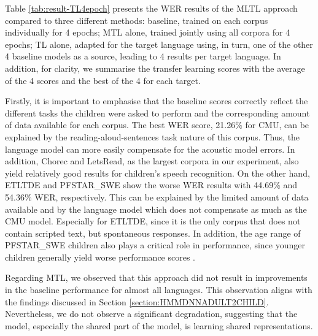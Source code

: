 Table \ref{tab:result-TL4epoch} presents the \ac{WER} results of the \ac{MLTL} approach compared to three different methods: baseline, trained on each corpus individually for 4 epochs; \ac{MTL} alone, trained jointly using all corpora for 4 epochs; \ac{TL} alone, adapted for the target language using, in turn, one of the other 4 baseline models as a source, leading to 4 results per target language. In addition, for clarity, we summarise the transfer learning scores with the average of the 4 scores and the best of the 4 for each target.

Firstly, it is important to emphasise that the baseline scores correctly reflect the different tasks the children were asked to perform and the corresponding amount of data available for each corpus. The best \ac{WER} score, 21.26\% for CMU, can be explained by the reading-aloud-sentences task nature of this corpus. Thus, the language model can more easily compensate for the acoustic model errors. In addition, Chorec and LetsRead, as the largest corpora in our experiment, also yield relatively good results for children's speech recognition. On the other hand, ETLTDE and PFSTAR\_SWE show the worse \ac{WER} results with 44.69\%  and 54.36\% \ac{WER}, respectively. This can be explained by the limited amount of data available and by the language model which does not compensate as much as the CMU model. Especially for ETLTDE, since it is the only corpus that does not contain scripted text, but spontaneous responses. In addition, the age range of PFSTAR\_SWE children also plays a critical role in performance, since younger children generally yield worse performance scores \cite{TFchildren}.

Regarding \ac{MTL}, we observed that this approach did not result in improvements in the baseline performance for almost all languages. This observation aligns with the findings discussed in Section \ref{section:HMMDNNADULT2CHILD}. Nevertheless, we do not observe a significant degradation, suggesting that the model, especially the shared part of the model, is learning shared representations. 



